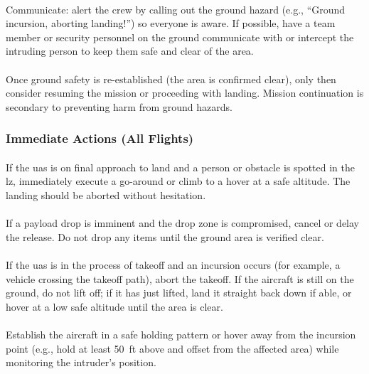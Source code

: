                 \paragraph{}Communicate: alert the crew by calling out the ground hazard (e.g., “Ground incursion, aborting landing!”) so everyone is aware. If possible, have a team member or security personnel on the ground communicate with or intercept the intruding person to keep them safe and clear of the area.
                \paragraph{}Once ground safety is re-established (the area is confirmed clear), only then consider resuming the mission or proceeding with landing. Mission continuation is secondary to preventing harm from ground hazards.
            
            \subsubsection{Immediate Actions (All Flights)}
                \paragraph{} If the \ac{uas} is on final approach to land and a person or obstacle is spotted in the \ac{lz}, immediately execute a go-around or climb to a hover at a safe altitude. The landing should be aborted without hesitation.
                \paragraph{} If a payload drop is imminent and the drop zone is compromised, cancel or delay the release. Do not drop any items until the ground area is verified clear.
                \paragraph{} If the \ac{uas} is in the process of takeoff and an incursion occurs (for example, a vehicle crossing the takeoff path), abort the takeoff. If the aircraft is still on the ground, do not lift off; if it has just lifted, land it straight back down if able, or hover at a low safe altitude until the area is clear.
                \paragraph{} Establish the aircraft in a safe holding pattern or hover away from the incursion point (e.g., hold at least 50~ft above and offset from the affected area) while monitoring the intruder’s position.
